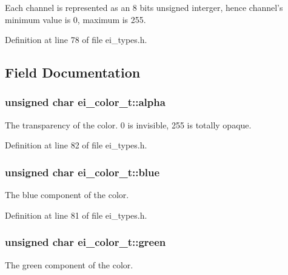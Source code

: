 Each channel is represented as an 8 bits unsigned interger, hence channel's minimum value is 0, maximum is 255. 

Definition at line 78 of file ei\-\_\-types.\-h.



\subsection{Field Documentation}
\hypertarget{structei__color__t_af213a14356db920b1a04f5270263ae61}{
\subsubsection[{alpha}]{\setlength{\rightskip}{0pt plus 5cm}unsigned char ei\-\_\-color\-\_\-t\-::alpha}}\label{structei__color__t_af213a14356db920b1a04f5270263ae61}


The transparency of the color. 0 is invisible, 255 is totally opaque. 



Definition at line 82 of file ei\-\_\-types.\-h.

\hypertarget{structei__color__t_af8d67b7a72cbb586519b55033350fb8c}{
\subsubsection[{blue}]{\setlength{\rightskip}{0pt plus 5cm}unsigned char ei\-\_\-color\-\_\-t\-::blue}}\label{structei__color__t_af8d67b7a72cbb586519b55033350fb8c}


The blue component of the color. 



Definition at line 81 of file ei\-\_\-types.\-h.

\hypertarget{structei__color__t_ad85ce262fb9c76fe3c52b4eed19505d1}{
\subsubsection[{green}]{\setlength{\rightskip}{0pt plus 5cm}unsigned char ei\-\_\-color\-\_\-t\-::green}}\label{structei__color__t_ad85ce262fb9c76fe3c52b4eed19505d1}


The green component of the color. 




